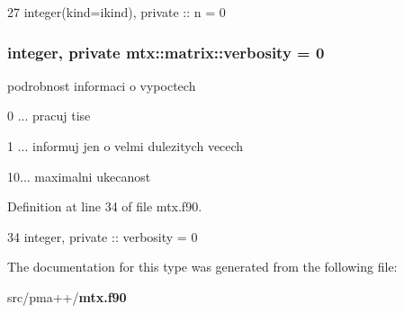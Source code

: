 \begin{DoxyCode}
27         \textcolor{keywordtype}{integer(kind=ikind)}, \textcolor{keywordtype}{private} :: n = 0
\end{DoxyCode}
\subsubsection[{verbosity}]{\setlength{\rightskip}{0pt plus 5cm}integer, private mtx\+::matrix\+::verbosity = 0\hspace{0.3cm}{\ttfamily [private]}}\label{structmtx_1_1matrix_a435fb04f43f197c4b7892bc40db4bae0}


podrobnost informaci o vypoctech 


\begin{DoxyItemize}
\item 0 ... pracuj tise
\item 1 ... informuj jen o velmi dulezitych vecech
\item 10... maximalni ukecanost 
\end{DoxyItemize}

Definition at line 34 of file mtx.\+f90.


\begin{DoxyCode}
34         \textcolor{keywordtype}{integer}, \textcolor{keywordtype}{private} :: verbosity = 0
\end{DoxyCode}


The documentation for this type was generated from the following file\+:\begin{DoxyCompactItemize}
\item 
src/pma++/{\bf mtx.\+f90}\end{DoxyCompactItemize}
